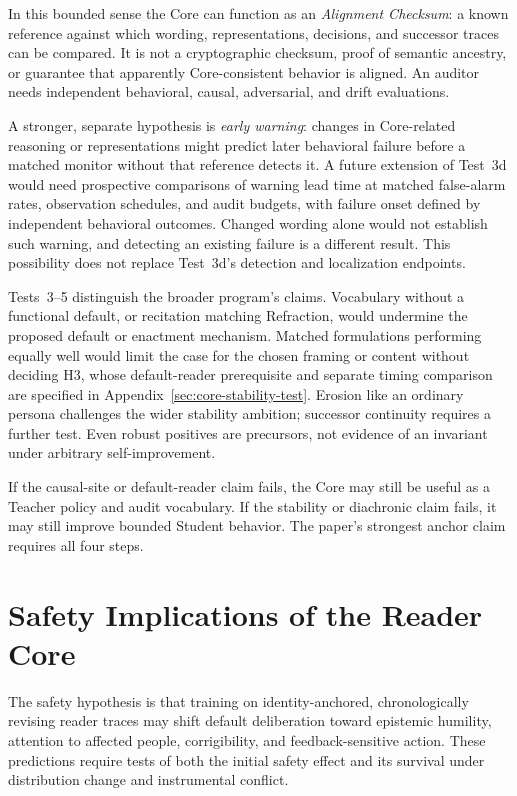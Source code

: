 \documentclass[11pt]{article}
\begin{document}
In this bounded sense the Core can function as an \emph{Alignment Checksum}: a
known reference against which wording, representations, decisions, and
successor traces can be compared. It is not a cryptographic checksum, proof of
semantic ancestry, or guarantee that apparently Core-consistent behavior is
aligned. An auditor needs independent behavioral, causal, adversarial, and
drift evaluations.

A stronger, separate hypothesis is \emph{early warning}: changes in Core-related
reasoning or representations might predict later behavioral failure before a
matched monitor without that reference detects it. A future extension of
Test~3d would need prospective comparisons of warning lead time at matched
false-alarm rates, observation schedules, and audit budgets, with failure onset
defined by independent behavioral outcomes. Changed wording alone would not
establish such warning, and detecting an existing failure is a different
result. This possibility does not replace Test~3d's detection and localization
endpoints.

Tests~3--5 distinguish the broader program's claims. Vocabulary without a
functional default, or recitation matching Refraction, would undermine the
proposed default or enactment mechanism. Matched formulations performing
equally well would limit the case for the chosen framing or content without
deciding H3, whose default-reader prerequisite and separate timing comparison
are specified in Appendix~\ref{sec:core-stability-test}. Erosion like an
ordinary persona challenges the wider stability ambition; successor continuity
requires a further test. Even robust positives are precursors, not evidence
of an invariant under arbitrary self-improvement.

If the causal-site or default-reader claim fails, the Core may still be useful
as a Teacher policy and audit vocabulary. If the stability or diachronic claim
fails, it may still improve bounded Student behavior. The paper's strongest
anchor claim requires all four steps.

\section{Safety Implications of the Reader Core}\label{sec:implications}

The safety hypothesis is that training on identity-anchored, chronologically
revising reader traces may shift default deliberation toward epistemic
humility, attention to affected people, corrigibility, and feedback-sensitive
action. These predictions require tests of both the initial safety effect and
its survival under distribution change and instrumental conflict.
\end{document}

